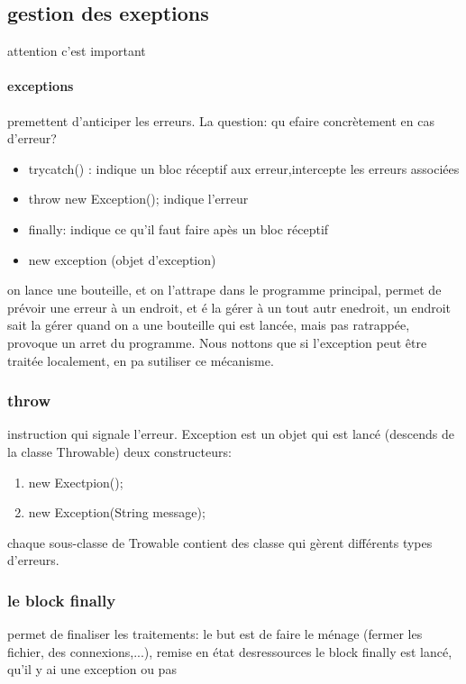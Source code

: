 \documentclass[a4paper,10pt]{article}
\begin{document}
\subsection{gestion des exeptions}
attention c'est important
\paragraph{exceptions}
premettent d'anticiper les erreurs. La question: qu efaire concrètement en cas d'erreur?
\begin{itemize}
 \item try{}catch(){} : indique un bloc réceptif aux erreur,intercepte les erreurs associées
 \item throw new Exception(); indique l'erreur
 \item finally: indique ce qu'il faut faire apès un bloc réceptif
 \item new exception (objet d'exception)
\end{itemize}
on lance une bouteille, et on l'attrape dans le programme principal, permet de prévoir une erreur à un endroit, et é la gérer à un tout autr enedroit, un endroit sait la gérer
\newline
quand on a une bouteille qui est lancée, mais pas ratrappée, provoque un arret du programme. Nous nottons que si l'exception peut être traitée localement, en pa sutiliser ce mécanisme.
\subsubsection{throw}
instruction qui signale l'erreur.
\newline
Exception est un objet qui est lancé (descends de la classe Throwable)
\newline
deux constructeurs:
\begin{enumerate}
 \item new Exectpion();
 \item new Exception(String message);
\end{enumerate}
chaque sous-classe de Trowable contient des classe qui gèrent différents types d'erreurs.
\subsubsection{le block finally}
permet de finaliser les traitements: le but est de faire le ménage (fermer les fichier, des connexions,...), remise en état desressources 
\newline
le block finally est lancé, qu'il y ai une exception ou pas 
\end{document}
